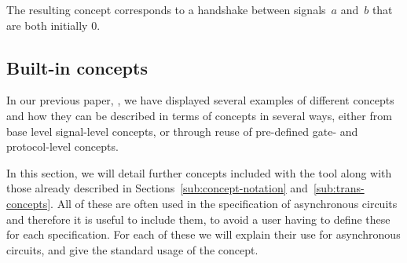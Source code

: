 \documentclass[british,conference,compsoc]{IEEEtran}
\begin{document}
\vspace{-1mm}

The resulting concept corresponds to a handshake between signals~$a$
and~$b$ that are both initially $0$.

\vspace{-2mm}

\subsection{Built-in concepts \label{sub:built-in}}

\vspace{-3mm}

In our previous paper, \cite{2015_Beaumont_MEMOCODE}, we have displayed several
examples of different concepts and how they can be described in terms of 
concepts in several ways, either from base level signal-level concepts, or 
through reuse of pre-defined gate- and protocol-level concepts.

In this section, we will detail further concepts included with the tool along 
with those already described in Sections~\ref{sub:concept-notation} 
and~\ref{sub:trans-concepts}. All of these are often used in the specification 
of asynchronous circuits and therefore it is useful to include them, to avoid a 
user having to define these for each specification. For each of these we will 
explain their use for asynchronous circuits, and give the standard usage of the 
concept. 
\end{document}
